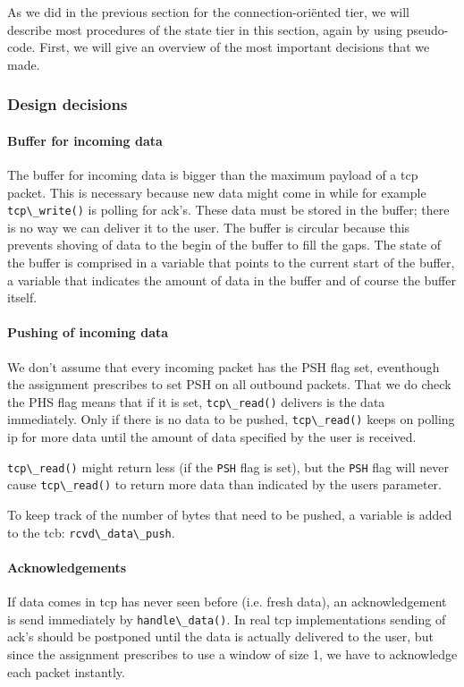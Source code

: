 \documentclass[11pt]{article}
\begin{document}
As we did in the previous section for the connection-ori\"ented tier, we
will describe most procedures of the state tier in this section, again by
using pseudo-code.
First, we will give an overview of the most important decisions that we made.

\subsubsection{Design decisions}


\paragraph{Buffer for incoming data}
    The buffer for incoming data is bigger than the maximum payload of a tcp
    packet. This is necessary because new data might come in while for example 
    \verb|tcp\_write()| is polling for ack's. These data must be stored in the 
    buffer; 
    there is no way we can deliver it to the user.
    The buffer is circular because this prevents shoving of data to the begin of 
    the buffer to fill the gaps. 
    The state of the buffer is comprised in a variable that points to the 
    current start of the buffer, a variable that indicates the amount of data in 
    the buffer and of course the buffer itself.    

\paragraph{Pushing of incoming data}
    We don't assume that every incoming packet has the PSH flag set, eventhough 
    the assignment prescribes to set PSH on all outbound packets. That we do
    check the PHS flag means 
    that if it is set, \verb|tcp\_read()| delivers is the data immediately.
    Only if there is no data to be pushed, \verb|tcp\_read()| keeps on polling 
    ip for 
    more data until the amount of data specified by the user is received.
    
    \verb|tcp\_read()| might return less (if the \verb|PSH| flag is set), but 
    the \verb|PSH| flag 
    will never cause \verb|tcp\_read()| to return more 
    data than indicated by the users parameter.
    
    To keep track of the number of bytes that need to be pushed, a variable is 
    added to the tcb: \verb|rcvd\_data\_push|.

\paragraph{Acknowledgements}
    If data comes in tcp has never seen before (i.e. fresh data), an 
    acknowledgement is send
    immediately by \verb|handle\_data()|. In real tcp implementations sending of
     ack's 
    should be postponed until the data is actually delivered to the user, 
    but since the assignment prescribes to use a window of size 1, we have to 
    acknowledge each packet instantly.
\end{document}
